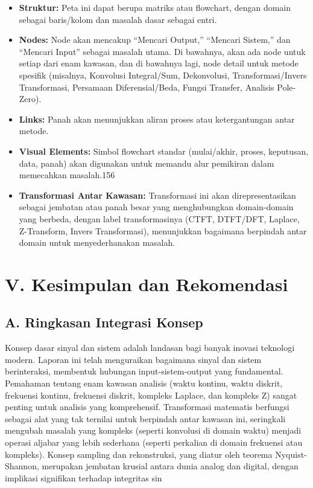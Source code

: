 \documentclass[
  letterpaper,
  DIV=11,
  numbers=noendperiod]{scrreprt}
\begin{document}
\begin{itemize}
\item
  \textbf{Struktur:} Peta ini dapat berupa matriks atau flowchart,
  dengan domain sebagai baris/kolom dan masalah dasar sebagai entri.
\item
  \textbf{Nodes:} Node akan mencakup ``Mencari Output,'' ``Mencari
  Sistem,'' dan ``Mencari Input'' sebagai masalah utama. Di bawahnya,
  akan ada node untuk setiap dari enam kawasan, dan di bawahnya lagi,
  node detail untuk metode spesifik (misalnya, Konvolusi Integral/Sum,
  Dekonvolusi, Transformasi/Invers Transformasi, Persamaan
  Diferensial/Beda, Fungsi Transfer, Analisis Pole-Zero).
\item
  \textbf{Links:} Panah akan menunjukkan aliran proses atau
  ketergantungan antar metode.
\item
  \textbf{Visual Elements:} Simbol flowchart standar (mulai/akhir,
  proses, keputusan, data, panah) akan digunakan untuk memandu alur
  pemikiran dalam memecahkan masalah.156
\item
  \textbf{Transformasi Antar Kawasan:} Transformasi ini akan
  direpresentasikan sebagai jembatan atau panah besar yang menghubungkan
  domain-domain yang berbeda, dengan label transformasinya (CTFT,
  DTFT/DFT, Laplace, Z-Transform, Invers Transformasi), menunjukkan
  bagaimana berpindah antar domain untuk menyederhanakan masalah.
\end{itemize}

\section{V. Kesimpulan dan
Rekomendasi}\label{v.-kesimpulan-dan-rekomendasi}

\subsection{A. Ringkasan Integrasi
Konsep}\label{a.-ringkasan-integrasi-konsep}

Konsep dasar sinyal dan sistem adalah landasan bagi banyak inovasi
teknologi modern. Laporan ini telah menguraikan bagaimana sinyal dan
sistem berinteraksi, membentuk hubungan input-sistem-output yang
fundamental. Pemahaman tentang enam kawasan analisis (waktu kontinu,
waktu diskrit, frekuensi kontinu, frekuensi diskrit, kompleks Laplace,
dan kompleks Z) sangat penting untuk analisis yang komprehensif.
Transformasi matematis berfungsi sebagai alat yang tak ternilai untuk
berpindah antar kawasan ini, seringkali mengubah masalah yang kompleks
(seperti konvolusi di domain waktu) menjadi operasi aljabar yang lebih
sederhana (seperti perkalian di domain frekuensi atau kompleks). Konsep
sampling dan rekonstruksi, yang diatur oleh teorema Nyquist-Shannon,
merupakan jembatan krusial antara dunia analog dan digital, dengan
implikasi signifikan terhadap integritas sin
\end{document}
